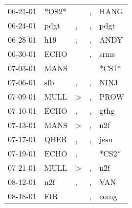 \begin{supertabular}{p{0.07\textwidth}p{0.06\textwidth}p{0.02\textwidth}p{0.02\textwidth}p{0.06\textwidth}}
          06-21-01\textsuperscript{} &                            *OS2* &                  &                , &           HANG\textsuperscript{} \\
          06-24-01\textsuperscript{} &           pdgt\textsuperscript{} &                , &                , &           pdgt\textsuperscript{} \\
          06-28-01\textsuperscript{} &            h19\textsuperscript{} &                , &                , &           ANDY\textsuperscript{} \\
          06-30-01\textsuperscript{} &           ECHO\textsuperscript{} &                  &                , &           srms\textsuperscript{} \\
          07-03-01\textsuperscript{} &           MANS\textsuperscript{} &                  &                  &                            *CS1* \\
          07-06-01\textsuperscript{} &            sfb\textsuperscript{} &                , &                , &           NINJ\textsuperscript{} \\
          07-09-01\textsuperscript{} &           MULL\textsuperscript{} &     \textgreater &                , &           PROW\textsuperscript{} \\
          07-10-01\textsuperscript{} &           ECHO\textsuperscript{} &                , &                , &           gthg\textsuperscript{} \\
          07-13-01\textsuperscript{} &           MANS\textsuperscript{} &     \textgreater &                , &            n2f\textsuperscript{} \\
          07-17-01\textsuperscript{} &           QBER\textsuperscript{} &                , &                , &           jesu\textsuperscript{} \\
          07-19-01\textsuperscript{} &           ECHO\textsuperscript{} &                , &                  &                            *CS2* \\
          07-21-01\textsuperscript{} &           MULL\textsuperscript{} &     \textgreater &                , &            n2f\textsuperscript{} \\
          08-12-01\textsuperscript{} &            n2f\textsuperscript{} &                , &                , &            VAN\textsuperscript{} \\
          08-18-01\textsuperscript{} &            FIR\textsuperscript{} &                  &                , &           comg\textsuperscript{} \\

\end{supertabular}
